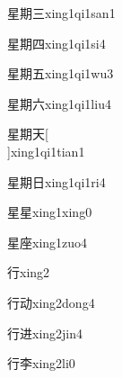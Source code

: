 \begin{verbete}[9;12;3]{星期三}{xing1qi1san1}
\end{verbete}

\begin{verbete}[9;12;5]{星期四}{xing1qi1si4}
\end{verbete}

\begin{verbete}[9;12;4]{星期五}{xing1qi1wu3}
\end{verbete}

\begin{verbete}[9;12;3]{星期六}{xing1qi1liu4}
\end{verbete}

\begin{verbete}[9;12;4]{星期天}[\\]{xing1qi1tian1}
\end{verbete}

\begin{verbete}[9;12;4]{星期日}{xing1qi1ri4}
\end{verbete}

\begin{verbete}[9;9]{星星}{xing1xing0}
\end{verbete}

\begin{verbete}[9;10]{星座}{xing1zuo4}
\end{verbete}

\begin{verbete}[6]{行}{xing2}
\end{verbete}

\begin{verbete}[6;6]{行动}{xing2dong4}
\end{verbete}

\begin{verbete}[6;7]{行进}{xing2jin4}
\end{verbete}

\begin{verbete}[6;7]{行李}{xing2li0}
\end{verbete}

